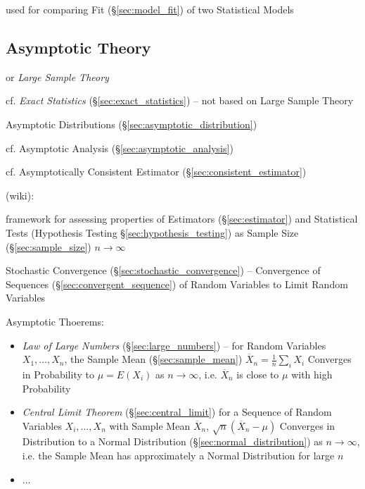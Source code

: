 used for comparing Fit (\S\ref{sec:model_fit}) of two Statistical Models



\subsection{Asymptotic Theory}\label{sec:asymptotic_theory}

or \emph{Large Sample Theory}

\fist cf. \emph{Exact Statistics} (\S\ref{sec:exact_statistics}) -- not based on
Large Sample Theory

\fist Asymptotic Distributions (\S\ref{sec:asymptotic_distribution})

\fist cf. Asymptotic Analysis (\S\ref{sec:asymptotic_analysis})

\fist cf. Asymptotically Consistent Estimator (\S\ref{sec:consistent_estimator})

(wiki):

framework for assessing properties of Estimators (\S\ref{sec:estimator}) and
Statistical Tests (Hypothesis Testing \S\ref{sec:hypothesis_testing}) as Sample
Size (\S\ref{sec:sample_size}) $n \rightarrow \infty$

\fist Stochastic Convergence (\S\ref{sec:stochastic_convergence}) -- Convergence
of Sequences (\S\ref{sec:convergent_sequence}) of Random Variables to Limit
Random Variables

Asymptotic Thoerems:
\begin{itemize}
  \item \emph{Law of Large Numbers} (\S\ref{sec:large_numbers}) --
    for Random Variables $X_1, \ldots, X_n$, the Sample Mean
    (\S\ref{sec:sample_mean}) $\overline{X}_n = \frac{1}{n}\sum_i X_i$ Converges
    in Probability to $\mu = E(X_i)$ as $n \rightarrow \infty$, i.e.
    $\overline{X}_n$ is close to $\mu$ with high Probability
  \item \emph{Central Limit Theorem} (\S\ref{sec:central_limit})
    for a Sequence of Random Variables $X_i, \ldots, X_n$ with Sample Mean
    $\overline{X}_n$, $\sqrt{n}(\overline{X}_n - \mu)$
    Converges in Distribution to a Normal Distribution
    (\S\ref{sec:normal_distribution}) as $n \rightarrow \infty$, i.e. the Sample
    Mean has approximately a Normal Distribution for large $n$
  \item ...
\end{itemize}



